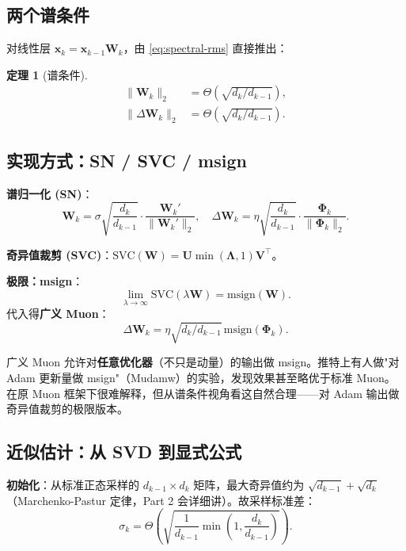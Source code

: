 \documentclass[11pt,a4paper]{ctexart}
\newtheorem{theorem}{定理}[section]
\theoremstyle{definition}
\theoremstyle{remark}
\newcommand{\msign}{\mathrm{msign}}
\newcommand{\bigT}{\Theta}
\begin{document}
\subsection{两个谱条件}
 
对线性层 $\bm{x}_k = \bm{x}_{k-1}\bm{W}_k$，由 \eqref{eq:spectral-rms} 直接推出：
 
\begin{theorem}[谱条件]
\begin{align}
\|\bm{W}_k\|_2 &= \bigT\!\left(\sqrt{d_k/d_{k-1}}\right), \label{eq:spec-cond-1} \\
\|\Delta\bm{W}_k\|_2 &= \bigT\!\left(\sqrt{d_k/d_{k-1}}\right). \label{eq:spec-cond-2}
\end{align}
\end{theorem}
 
\subsection{实现方式：SN / SVC / msign}
 
\textbf{谱归一化 (SN)}：
\[
\bm{W}_k = \sigma\sqrt{\frac{d_k}{d_{k-1}}} \cdot \frac{\bm{W}_k'}{\|\bm{W}_k'\|_2}, \quad
\Delta\bm{W}_k = \eta\sqrt{\frac{d_k}{d_{k-1}}} \cdot \frac{\bm{\Phi}_k}{\|\bm{\Phi}_k\|_2}.
\]
 
\textbf{奇异值裁剪 (SVC)}：$\mathrm{SVC}(\bm{W}) = \bm{U}\min(\bm{\Lambda},1)\bm{V}^\top$。
 
\textbf{极限：msign}：
\[
\lim_{\lambda \to \infty} \mathrm{SVC}(\lambda\bm{W}) = \msign(\bm{W}).
\]
代入得\textbf{广义 Muon}：
\begin{equation}
\Delta\bm{W}_k = \eta\sqrt{d_k/d_{k-1}}\, \msign(\bm{\Phi}_k).
\end{equation}
 
\begin{keyinsight}
广义 Muon 允许对\textbf{任意优化器}（不只是动量）的输出做 msign。推特上有人做"对 Adam 更新量做 msign"（Mudamw）的实验，发现效果甚至略优于标准 Muon。在原 Muon 框架下很难解释，但从谱条件视角看这自然合理——对 Adam 输出做奇异值裁剪的极限版本。
\end{keyinsight}
 
\subsection{近似估计：从 SVD 到显式公式}
 
\textbf{初始化}：从标准正态采样的 $d_{k-1} \times d_k$ 矩阵，最大奇异值约为 $\sqrt{d_{k-1}} + \sqrt{d_k}$（Marchenko-Pastur 定律，Part 2 会详细讲）。故采样标准差：
\begin{equation}
\sigma_k = \bigT\!\left(\sqrt{\frac{1}{d_{k-1}} \min\!\left(1, \frac{d_k}{d_{k-1}}\right)}\right).
\label{eq:spectral-init}
\end{equation}
 
\end{document}
